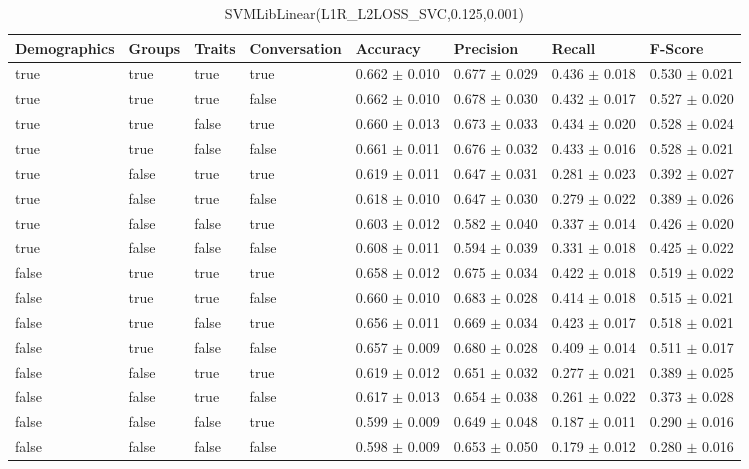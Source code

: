 \clearpage
\begin{table}[h]
	\centering
	\begin{tabular}{|l|l|l|l|l|l|l|l|} %
	\hline
	Demographics & Groups & Traits & Conversation & Accuracy & Precision & Recall & F-Score \\ \hline
	true & true & true & true & 0.662	\( \pm \) 0.010	& 0.677	\( \pm \) 0.029	& 0.436	\( \pm \) 0.018	& 0.530	\( \pm \) 0.021	\\ \hline
	true & true & true & false & 0.662	\( \pm \) 0.010	& 0.678	\( \pm \) 0.030	& 0.432	\( \pm \) 0.017	& 0.527	\( \pm \) 0.020	\\ \hline
	true & true & false & true & 0.660	\( \pm \) 0.013	& 0.673	\( \pm \) 0.033	& 0.434	\( \pm \) 0.020	& 0.528	\( \pm \) 0.024	\\ \hline
	true & true & false & false & 0.661	\( \pm \) 0.011	& 0.676	\( \pm \) 0.032	& 0.433	\( \pm \) 0.016	& 0.528	\( \pm \) 0.021	\\ \hline
	true & false & true & true & 0.619	\( \pm \) 0.011	& 0.647	\( \pm \) 0.031	& 0.281	\( \pm \) 0.023	& 0.392	\( \pm \) 0.027	\\ \hline
	true & false & true & false & 0.618	\( \pm \) 0.010	& 0.647	\( \pm \) 0.030	& 0.279	\( \pm \) 0.022	& 0.389	\( \pm \) 0.026	\\ \hline
	true & false & false & true & 0.603	\( \pm \) 0.012	& 0.582	\( \pm \) 0.040	& 0.337	\( \pm \) 0.014	& 0.426	\( \pm \) 0.020	\\ \hline
	true & false & false & false & 0.608	\( \pm \) 0.011	& 0.594	\( \pm \) 0.039	& 0.331	\( \pm \) 0.018	& 0.425	\( \pm \) 0.022	\\ \hline
	false & true & true & true & 0.658	\( \pm \) 0.012	& 0.675	\( \pm \) 0.034	& 0.422	\( \pm \) 0.018	& 0.519	\( \pm \) 0.022	\\ \hline
	false & true & true & false & 0.660	\( \pm \) 0.010	& 0.683	\( \pm \) 0.028	& 0.414	\( \pm \) 0.018	& 0.515	\( \pm \) 0.021	\\ \hline
	false & true & false & true & 0.656	\( \pm \) 0.011	& 0.669	\( \pm \) 0.034	& 0.423	\( \pm \) 0.017	& 0.518	\( \pm \) 0.021	\\ \hline
	false & true & false & false & 0.657	\( \pm \) 0.009	& 0.680	\( \pm \) 0.028	& 0.409	\( \pm \) 0.014	& 0.511	\( \pm \) 0.017	\\ \hline
	false & false & true & true & 0.619	\( \pm \) 0.012	& 0.651	\( \pm \) 0.032	& 0.277	\( \pm \) 0.021	& 0.389	\( \pm \) 0.025	\\ \hline
	false & false & true & false & 0.617	\( \pm \) 0.013	& 0.654	\( \pm \) 0.038	& 0.261	\( \pm \) 0.022	& 0.373	\( \pm \) 0.028	\\ \hline
	false & false & false & true & 0.599	\( \pm \) 0.009	& 0.649	\( \pm \) 0.048	& 0.187	\( \pm \) 0.011	& 0.290	\( \pm \) 0.016	\\ \hline
	false & false & false & false & 0.598	\( \pm \) 0.009	& 0.653	\( \pm \) 0.050	& 0.179	\( \pm \) 0.012	& 0.280	\( \pm \) 0.016	\\ \hline
	\end{tabular}
	\caption{SVMLibLinear(L1R\_L2LOSS\_SVC,0.125,0.001)}
	\label{tab:revpol}
\end{table}
